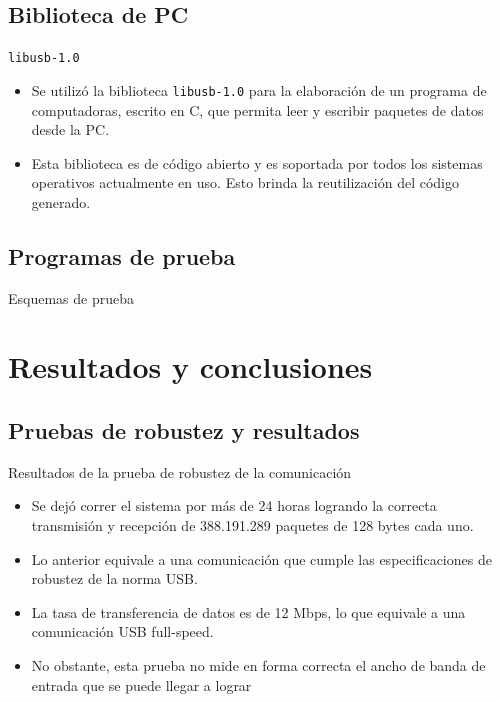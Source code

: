 \documentclass[11pt,a4paper]{beamer}
\begin{document}
		\subsection{Biblioteca de PC}
			\begin{frame}{\texttt{libusb-1.0}}
				\begin{itemize}
					\item Se utilizó la biblioteca \texttt{libusb-1.0} para la elaboración de un programa de computadoras, escrito en C, que permita leer y escribir paquetes de datos desde la PC.
					\item Esta biblioteca es de código abierto y es soportada por todos los sistemas operativos actualmente en uso. Esto brinda la reutilización del código generado.
				\end{itemize}
			\end{frame}
		\subsection{Programas de prueba}
			\begin{frame}{Esquemas de prueba}
				
			\end{frame}
	\section{Resultados y conclusiones}
		\subsection{Pruebas de robustez y resultados}
			\begin{frame}{Resultados de la prueba de robustez de la comunicación}
				\begin{itemize}
	 				\item Se dejó correr el sistema por más de 24 horas logrando la correcta transmisión y recepción de 388.191.289 paquetes de 128 bytes cada uno.
					\item Lo anterior equivale a una comunicación que cumple las especificaciones de robustez de la norma USB.
					\item La tasa de transferencia de datos es de 12 Mbps, lo que equivale a una comunicación USB full-speed.
					\item No obstante, esta prueba no mide en forma correcta el ancho de banda de entrada que se puede llegar a lograr
				\end{itemize}
			\end{frame}
\end{document}
